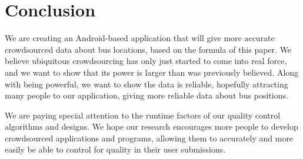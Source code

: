 \documentclass[9pt,twocolumn]{article}
\begin{document}
	
	
	
	\section*{Conclusion}	
	We are creating an Android-based application that will give more accurate crowdsourced data about bus locations, based on the formula of this paper. We believe ubiquitous crowdsourcing has only just started to come into real force, and we want to show that its power is larger than was previously believed. Along with being powerful, we want to show the data is reliable, hopefully attracting many people to our application, giving more reliable data about bus positions. 
	
	We are paying special attention to the runtime factors of our quality control algorithms and designs. We hope our research encourages more people to develop crowdsourced applications and programs, allowing them to accurately and more easily be able to control for quality in their user submissions.
	
	
\end{document}
